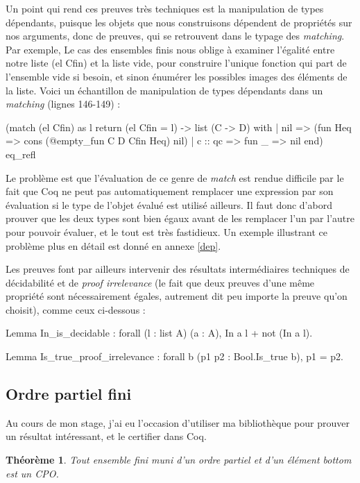 \documentclass{article}
\newcommand\code[1]{{\fontfamily{lmtt}\selectfont #1}}
\newtheorem{theorem}{Théorème}[section]
\theoremstyle{definition}
\begin{document}
Un point qui rend ces preuves très techniques est la manipulation de types dépendants, puisque les objets que nous construisons dépendent de propriétés sur nos arguments, donc de preuves, qui se retrouvent dans le typage des \textit{matching}. Par exemple, Le cas des ensembles finis nous oblige à examiner l'égalité entre notre liste \code{(el Cfin)} et la liste vide, pour construire l'unique fonction qui part de l'ensemble vide si besoin, et sinon énumérer les possibles images des éléments de la liste. Voici un échantillon de manipulation de types dépendants dans un \textit{matching} (lignes 146-149) :

\begin{coq}
(match (el Cfin) as l return (el Cfin = l) -> list (C -> D) with
            | nil => (fun Heq =>  cons (@empty_fun C D Cfin Heq) nil)
            | c :: qc => fun _ => nil
            end) eq_refl
\end{coq}

Le problème est que l'évaluation de ce genre de \textit{match} est rendue difficile par le fait que Coq ne peut pas automatiquement remplacer une expression par son évaluation si le type de l'objet évalué est utilisé ailleurs. Il faut donc d'abord prouver que les deux types sont bien égaux avant de les remplacer l'un par l'autre pour pouvoir évaluer, et le tout est très fastidieux. Un exemple illustrant ce problème plus en détail est donné en annexe \ref{dep}.

Les preuves font par ailleurs intervenir des résultats intermédiaires techniques de décidabilité et de \textit{proof irrelevance} (le fait que deux preuves d'une même propriété sont nécessairement égales, autrement dit peu importe la preuve qu'on choisit), comme ceux ci-dessous :

\begin{coq}
Lemma In_is_decidable : forall (l : list A) (a : A), {In a l} + {not (In a l)}.

Lemma Is_true_proof_irrelevance : forall b (p1 p2 : Bool.Is_true b), p1 = p2.
\end{coq}


\subsection{Ordre partiel fini}
\label{ordrepartiel}

Au cours de mon stage, j'ai eu l'occasion d'utiliser ma bibliothèque pour prouver un résultat intéressant, et le certifier dans Coq.

\begin{theorem}
Tout ensemble fini muni d'un ordre partiel et d'un élément bottom est un CPO.
\end{theorem}
\end{document}
